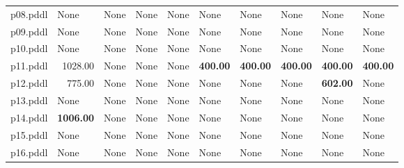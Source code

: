 \documentclass{article}
\begin{document}
\begin{tabular}{@{}lrrrrrrrrr@{}}
p08.pddl & \multicolumn{1}{|l|}{None} & \multicolumn{1}{|l|}{None} & \multicolumn{1}{|l|}{None} & \multicolumn{1}{|l|}{None} & \multicolumn{1}{|l|}{None} & \multicolumn{1}{|l|}{None} & \multicolumn{1}{|l|}{None} & \multicolumn{1}{|l|}{None} & \multicolumn{1}{|l|}{None} \\
p09.pddl & \multicolumn{1}{|l|}{None} & \multicolumn{1}{|l|}{None} & \multicolumn{1}{|l|}{None} & \multicolumn{1}{|l|}{None} & \multicolumn{1}{|l|}{None} & \multicolumn{1}{|l|}{None} & \multicolumn{1}{|l|}{None} & \multicolumn{1}{|l|}{None} & \multicolumn{1}{|l|}{None} \\
p10.pddl & \multicolumn{1}{|l|}{None} & \multicolumn{1}{|l|}{None} & \multicolumn{1}{|l|}{None} & \multicolumn{1}{|l|}{None} & \multicolumn{1}{|l|}{None} & \multicolumn{1}{|l|}{None} & \multicolumn{1}{|l|}{None} & \multicolumn{1}{|l|}{None} & \multicolumn{1}{|l|}{None} \\
p11.pddl & 1028.00 & \multicolumn{1}{|l|}{None} & \multicolumn{1}{|l|}{None} & \multicolumn{1}{|l|}{None} & \textbf{400.00} & \textbf{400.00} & \textbf{400.00} & \textbf{400.00} & \textbf{400.00} \\
p12.pddl & 775.00 & \multicolumn{1}{|l|}{None} & \multicolumn{1}{|l|}{None} & \multicolumn{1}{|l|}{None} & \multicolumn{1}{|l|}{None} & \multicolumn{1}{|l|}{None} & \multicolumn{1}{|l|}{None} & \textbf{602.00} & \multicolumn{1}{|l|}{None} \\
p13.pddl & \multicolumn{1}{|l|}{None} & \multicolumn{1}{|l|}{None} & \multicolumn{1}{|l|}{None} & \multicolumn{1}{|l|}{None} & \multicolumn{1}{|l|}{None} & \multicolumn{1}{|l|}{None} & \multicolumn{1}{|l|}{None} & \multicolumn{1}{|l|}{None} & \multicolumn{1}{|l|}{None} \\
p14.pddl & \textbf{1006.00} & \multicolumn{1}{|l|}{None} & \multicolumn{1}{|l|}{None} & \multicolumn{1}{|l|}{None} & \multicolumn{1}{|l|}{None} & \multicolumn{1}{|l|}{None} & \multicolumn{1}{|l|}{None} & \multicolumn{1}{|l|}{None} & \multicolumn{1}{|l|}{None} \\
p15.pddl & \multicolumn{1}{|l|}{None} & \multicolumn{1}{|l|}{None} & \multicolumn{1}{|l|}{None} & \multicolumn{1}{|l|}{None} & \multicolumn{1}{|l|}{None} & \multicolumn{1}{|l|}{None} & \multicolumn{1}{|l|}{None} & \multicolumn{1}{|l|}{None} & \multicolumn{1}{|l|}{None} \\
p16.pddl & \multicolumn{1}{|l|}{None} & \multicolumn{1}{|l|}{None} & \multicolumn{1}{|l|}{None} & \multicolumn{1}{|l|}{None} & \multicolumn{1}{|l|}{None} & \multicolumn{1}{|l|}{None} & \multicolumn{1}{|l|}{None} & \multicolumn{1}{|l|}{None} & \multicolumn{1}{|l|}{None} \\

\end{tabular}
\end{document}
